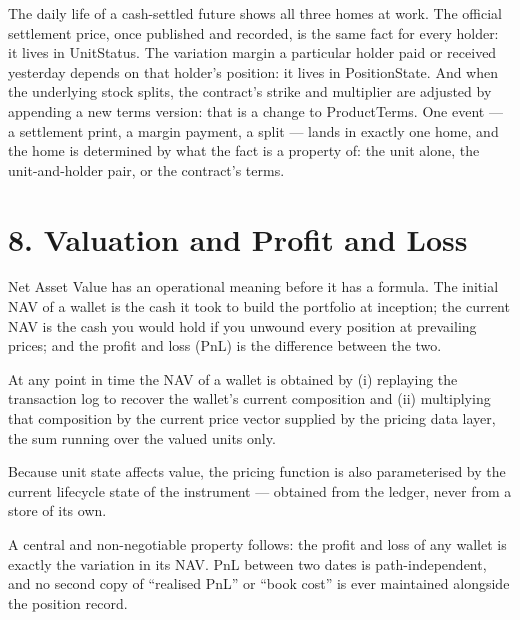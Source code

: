 \documentclass[11pt,a4paper]{article}
\newcommand{\clabel}[1]{\leavevmode\hypertarget{clause-#1}{}%
  \marginpar{\raggedright\scriptsize\ttfamily\textcolor{gray}{#1}}}
\begin{document}
The daily life of a cash-settled future shows all three homes at work.
The official settlement price, once published and recorded, is the same
fact for every holder: it lives in UnitStatus. The variation margin a
particular holder paid or received yesterday depends on that holder's
position: it lives in PositionState. And when the underlying stock
splits, the contract's strike and multiplier are adjusted by appending a
new terms version: that is a change to ProductTerms. \clabel{C-7.5}One event --- a
settlement print, a margin payment, a split --- lands in exactly one
home, and the home is determined by what the fact is a property of: the
unit alone, the unit-and-holder pair, or the contract's terms.

\hypertarget{valuation-and-profit-and-loss}{%
\section{8. Valuation and Profit and
Loss}\label{valuation-and-profit-and-loss}}

Net Asset Value has an operational meaning before it has a formula. \clabel{C-8.1}The
initial NAV of a wallet is the cash it took to build the portfolio at
inception; the current NAV is the cash you would hold if you unwound
every position at prevailing prices; and the profit and loss (PnL) is
the difference between the two.

\clabel{C-8.2}At any point in time the NAV of a wallet is obtained by (i) replaying
the transaction log to recover the wallet's current composition and (ii)
multiplying that composition by the current price vector supplied by the
pricing data layer, the sum running over the valued units only.

\clabel{C-8.3}Because unit state affects value, the pricing function is also
parameterised by the current lifecycle state of the instrument ---
obtained from the ledger, never from a store of its own.

\clabel{C-8.4}A central and non-negotiable property follows: the profit and loss of
any wallet is exactly the variation in its NAV. PnL between two dates is
path-independent, and no second copy of ``realised PnL'' or ``book
cost'' is ever maintained alongside the position record.
\end{document}

